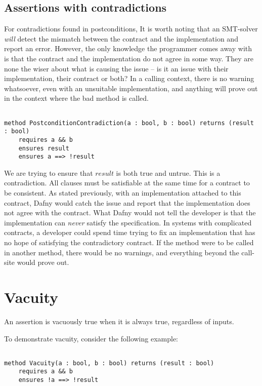 \documentclass{article}
\begin{document}
\subsection*{Assertions with contradictions}

For contradictions found in postconditions, It is worth noting that 
an SMT-solver {\it will} detect the mismatch between the contract and the implementation and report an error. However, 
the only knowledge the programmer comes away with is that the contract and the implementation do not agree in some way. They are none the wiser 
about what is causing the issue – is it an issue with their implementation, their contract or both? In a calling context, there is no warning 
whatsoever, even with an unsuitable implementation, and anything will prove out in the context where the bad method is called. 

\begin{lstlisting}

method PostconditionContradiction(a : bool, b : bool) returns (result : bool)
    requires a && b
    ensures result
    ensures a ==> !result

\end{lstlisting}

We are trying to ensure that \(result\) is both true and untrue. This is a contradiction. All clauses must be satisfiable
at the same time for a contract to be consistent. As stated previously, with an implementation attached to this contract,
Dafny would catch the issue and report that the implementation does not agree with the contract. What Dafny would not
tell the developer is that the implementation can {\it never} satisfy the specification. In systems with complicated
contracts, a developer could spend time trying to fix an implementation that has no hope of satisfying the contradictory
contract. If the method were to be called in another method, there would be no warnings, and everything beyond the call-site 
would prove out. 

\section{Vacuity}

An assertion is vacuously true when it is always true, regardless of inputs. 

To demonstrate vacuity, consider the following example:

\begin{lstlisting}

method Vacuity(a : bool, b : bool) returns (result : bool)
    requires a && b
    ensures !a ==> !result

\end{lstlisting}
\end{document}
